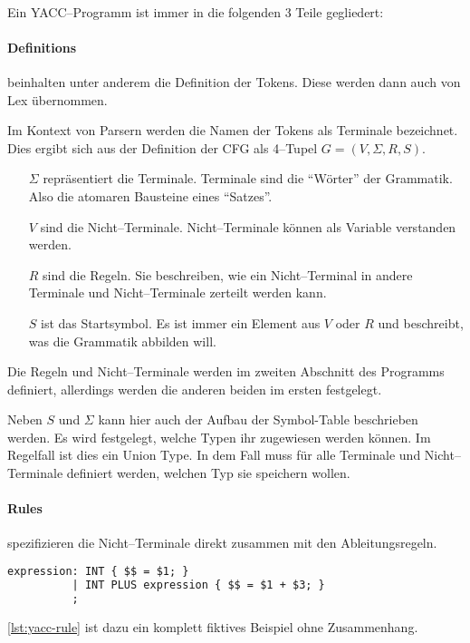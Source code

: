 \paragraph*{}
Ein \acs{YACC}--Programm ist immer in die folgenden 3 Teile gegliedert:~\autocite{debray-no-date}


\paragraph{Definitions} beinhalten unter anderem die Definition der Tokens.
Diese werden dann auch von Lex übernommen.

Im Kontext von Parsern werden die Namen der Tokens als Terminale bezeichnet.
Dies ergibt sich aus der Definition der \ac{CFG} als 4--Tupel $G=(V,\Sigma,R,S)$.~\autocite{sipser-1997}
\begin{itemize}
    \item[$\Sigma$] repräsentiert die Terminale.
    Terminale sind die \enquote{Wörter} der Grammatik.
    Also die atomaren Bausteine eines \enquote{Satzes}.
    \item[$V$] sind die Nicht--Terminale.
    Nicht--Terminale können als Variable verstanden werden.
    \item[$R$] sind die Regeln.
    Sie beschreiben, wie ein Nicht--Terminal in andere Terminale und Nicht--Terminale zerteilt werden kann.
    \item[$S$] ist das Startsymbol.
    Es ist immer ein Element aus $V$ oder $R$ und beschreibt, was die Grammatik abbilden will.
\end{itemize}
Die Regeln und Nicht--Terminale werden im zweiten Abschnitt des Programms definiert, allerdings werden die anderen beiden im ersten festgelegt.

Neben $S$ und $\Sigma$ kann hier auch der Aufbau der Symbol-Table beschrieben werden.
Es wird festgelegt, welche Typen ihr zugewiesen werden können.
Im Regelfall ist dies ein Union Type.
In dem Fall muss für alle Terminale und Nicht--Terminale definiert werden, welchen Typ sie speichern wollen.

\paragraph{Rules} spezifizieren die Nicht--Terminale direkt zusammen mit den Ableitungsregeln.
\begin{lstlisting}[label={lst:yacc-rule},caption={\acs{YACC} Regel},language=yacc]
expression: INT { $$ = $1; }
          | INT PLUS expression { $$ = $1 + $3; }
          ;
\end{lstlisting}
\autoref{lst:yacc-rule} ist dazu ein komplett fiktives Beispiel ohne Zusammenhang.

